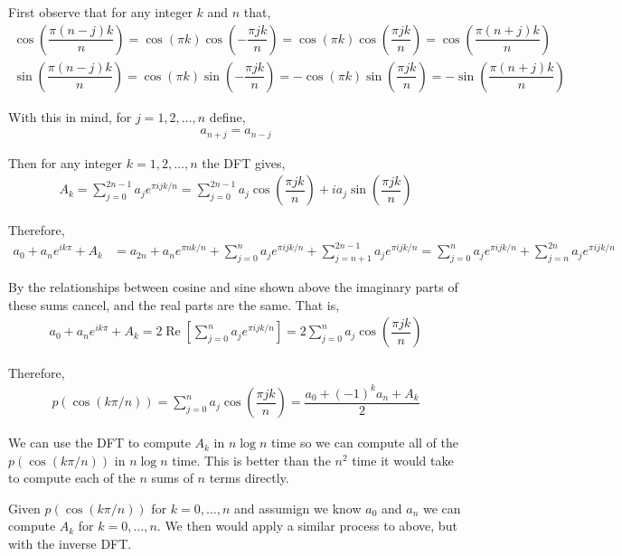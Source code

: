 \documentclass[10pt]{article}
\begin{document}
\begin{solution}[Solution]

First observe that for any integer \( k \) and \( n \) that,
\begin{align*}
    \cos \left( \dfrac{\pi(n-j)k}{n} \right) = \cos(\pi k)\cos \left( -\dfrac{\pi j k}{n} \right) = \cos(\pi k) \cos \left( \dfrac{\pi j k}{n} \right) = \cos \left( \dfrac{\pi(n+j)k}{n} \right)
    \\
    \sin \left( \dfrac{\pi(n-j)k}{n} \right) = \cos(\pi k)\sin \left( -\dfrac{\pi j k}{n} \right) = -\cos(\pi k) \sin \left( \dfrac{\pi j k}{n} \right) = -\sin \left( \dfrac{\pi(n+j)k}{n} \right)
\end{align*}

With this in mind, for \( j=1,2,\ldots, n \) define,
\begin{align*}
    a_{n+j} = a_{n-j}
\end{align*}

Then for any integer \( k=1,2,\ldots, n \) the DFT gives,
\begin{align*}
    A_k = \sum_{j=0}^{2n-1} a_j e^{\pi i j k / n} =  \sum_{j=0}^{2n-1}a_j \cos \left( \dfrac{\pi j k}{n} \right) + i a_j \sin \left( \dfrac{\pi j k}{n} \right)
\end{align*}

Therefore,
\begin{align*}
    a_0 + a_n e^{ik\pi} + A_k &= a_{2n} + a_n e^{\pi n k / n} + \sum_{j=0}^{n}a_je^{\pi i j k /n} + \sum_{j=n+1}^{2n-1}a_j e^{\pi i j k/n} 
    = \sum_{j=0}^{n} a_j e^{ \pi i j k / n} + \sum_{j=n}^{2n}a_j e^{\pi i j k /n}
\end{align*}

By the relationships between cosine and sine shown above the imaginary parts of these sums cancel, and the real parts are the same. That is, 
\begin{align*}
    a_0 + a_n e^{ik\pi} + A_k = 2\operatorname{Re} \left[ \sum_{j=0}^{n}a_j e^{\pi i j k/n} \right] = 2\sum_{j=0}^{n}a_j \cos \left( \dfrac{\pi j k}{n} \right)
\end{align*}

Therefore, 
\begin{align*}
    p(\cos(k \pi /n )) = \sum_{j=0}^{n} a_j \cos \left( \dfrac{\pi j k}{n} \right) = \dfrac{a_0 + (-1)^k a_n + A_k}{2}
\end{align*}

We can use the DFT to compute \( A_k \) in \( n\log n \) time so we can compute all of the \( p(\cos(k\pi/n)) \) in \( n\log n \) time. This is better than the \( n^2 \) time it would take to compute each of the \( n \) sums of \( n \) terms directly. 


Given \( p(\cos( k \pi / n)) \) for \( k=0,\ldots, n\) and assumign we know \( a_0 \) and \( a_n \) we can compute \( A_k \) for \( k=0,\ldots,n \).
We then would apply a similar process to above, but with the inverse DFT.

\end{solution}
\end{document}
